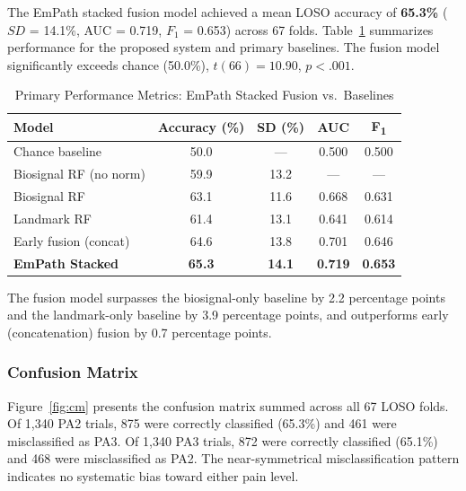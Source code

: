 \documentclass[10pt, twocolumn]{article}
\begin{document}
The EmPath stacked fusion model achieved a mean LOSO accuracy of \textbf{65.3\%}
($SD$ = 14.1\%, AUC = 0.719, $F_1$ = 0.653) across 67 folds. Table~\ref{tab:perf}
summarizes performance for the proposed system and primary baselines. The fusion model
significantly exceeds chance (50.0\%), $t(66) = 10.90$, $p < .001$.

\begin{table}[t]
\centering
\caption{Primary Performance Metrics: EmPath Stacked Fusion vs.\ Baselines}
\label{tab:perf}
\small
\begin{tabular}{lcccc}
\toprule
\textbf{Model} & \textbf{Accuracy (\%)} & \textbf{SD (\%)} & \textbf{AUC} & \textbf{F\textsubscript{1}} \\
\midrule
Chance baseline         & 50.0 & ---  & 0.500 & 0.500 \\
Biosignal RF (no norm)  & 59.9 & 13.2 & ---   & ---   \\
Biosignal RF            & 63.1 & 11.6 & 0.668 & 0.631 \\
Landmark RF             & 61.4 & 13.1 & 0.641 & 0.614 \\
Early fusion (concat)   & 64.6 & 13.8 & 0.701 & 0.646 \\
\textbf{EmPath Stacked} & \textbf{65.3} & \textbf{14.1} & \textbf{0.719} & \textbf{0.653} \\
\bottomrule
\end{tabular}
\end{table}

The fusion model surpasses the biosignal-only baseline by 2.2 percentage points and the
landmark-only baseline by 3.9 percentage points, and outperforms early (concatenation)
fusion by 0.7 percentage points.

\subsubsection{Confusion Matrix}

Figure~\ref{fig:cm} presents the confusion matrix summed across all 67 LOSO folds.
Of 1,340 PA2 trials, 875 were correctly classified (65.3\%) and 461 were misclassified
as PA3. Of 1,340 PA3 trials, 872 were correctly classified (65.1\%) and 468 were
misclassified as PA2. The near-symmetrical misclassification pattern indicates no
systematic bias toward either pain level.
\end{document}

